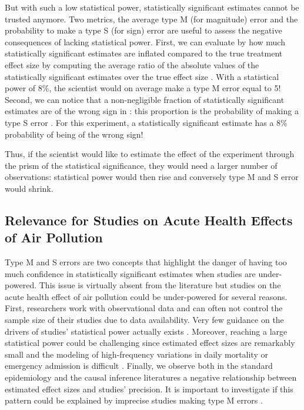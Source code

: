 \documentclass[12pt]{article}
\begin{document}
    But with such a low statistical power, statistically significant estimates cannot be trusted anymore. Two metrics, the average type M (for magnitude) error and the probability to make a type S (for sign) error are useful to assess the negative consequences of lacking statistical power. First, we can evaluate by how much statistically significant estimates are inflated compared to the true treatment effect size by computing the average ratio of the absolute values of the statistically significant estimates over the true effect size \citep{gelman_beyond_2014}. With a statistical power of 8\%, the scientist would on average make a type M error equal to 5! Second, we can notice that a non-negligible fraction of statistically significant estimates are of the wrong sign in : this proportion is the probability of making a type S error  \citep{gelman_type_2000}. For this experiment, a statistically significant estimate has a 8\% probability of being of the wrong sign! 
    
    Thus, if the scientist would like to estimate the effect of the experiment through the prism of the statistical significance, they would need a larger number of observations:  statistical power would then rise and conversely type M and S error would shrink.
    
\subsection{Relevance for Studies on Acute Health Effects of Air Pollution}

    Type M and S errors are two concepts that highlight the danger of having too much confidence in statistically significant estimates when studies are under-powered. This issue is virtually absent from the literature but studies on the acute health effect of air pollution could be under-powered for several reasons. First, researchers work with observational data and can often not control the sample size of their studies due to data availability. Very few guidance on the drivers of studies' statistical power actually exists \citep{winquist2012power, bhaskaran2013time}. Moreover, reaching a large statistical power could be challenging since estimated effect sizes are remarkably small and the modeling of high-frequency variations in daily mortality or emergency admission is difficult \citep{peng2006model, peng2008statistical}. Finally, we observe both in the standard epidemiology and the causal inference literatures a negative relationship between estimated effect sizes and studies' precision. It is important to investigate if this pattern could be explained by imprecise studies making type M errors \citep{ioannidis2008most, gelman_beyond_2014, ioannidis_power_2017, ferraro_featureis_2020}.
    
\end{document}
